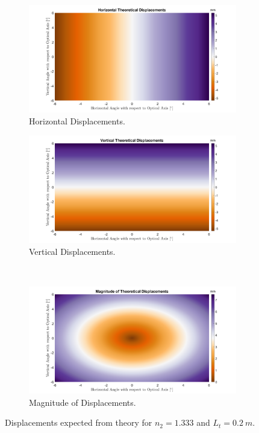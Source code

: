 \documentclass{article}
\begin{document}
\begin{figure}
\begin{subfigure}[b]{.5\linewidth}
\centering \includegraphics[width=\linewidth]{hordispnmin.png}
\caption{Horizontal Displacements.}\label{fig:1a}
\end{subfigure}%
\begin{subfigure}[b]{.5\linewidth}
\centering\large \includegraphics[width=\linewidth]{verdispnmin.png}
\caption{Vertical Displacements.}\label{fig:1b}
\end{subfigure} \\
\begin{subfigure}[b]{\linewidth}
\centering \includegraphics[width=\linewidth]{magndispnmin.png}
\caption{Magnitude of Displacements.}\label{fig:1c}
\end{subfigure}%
\caption{Displacements expected from theory for $n_2 = 1.333$ and $L_t = \SI{0.2}{m}$.}\label{fig:1}
\end{figure}
\end{document}
